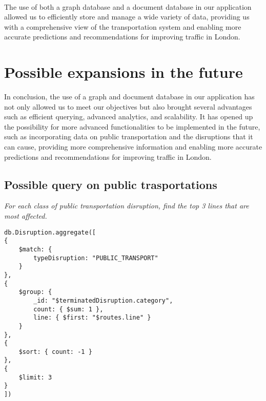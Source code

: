\paragraph{}
The use of both a graph database and a document database in our application allowed us to efficiently store and manage a wide variety of data, providing us with a comprehensive view of the transportation system and enabling more accurate predictions and recommendations for improving traffic in London.

\section{Possible expansions in the future}

In conclusion, the use of a graph and document database in our application has not only allowed us to meet our objectives but also brought several advantages such as efficient querying, advanced analytics, and scalability. It has opened up the possibility for more advanced functionalities to be implemented in the future, such as incorporating data on public transportation and the disruptions that it can cause, providing more comprehensive information and enabling more accurate predictions and recommendations for improving traffic in London.

\pagebreak
\subsection{Possible query on public trasportations}

\textit{For each class of public transportation disruption, find the top 3  lines that are most affected.}


\begin{lstlisting}
db.Disruption.aggregate([
{
	$match: {
		typeDisruption: "PUBLIC_TRANSPORT"
	}
},
{
	$group: {
		_id: "$terminatedDisruption.category",
		count: { $sum: 1 },
		line: { $first: "$routes.line" }
	}
},
{
	$sort: { count: -1 }
},
{
	$limit: 3
}
])
\end{lstlisting}
